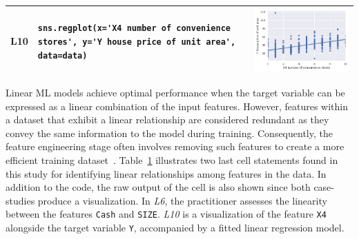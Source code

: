 \documentclass[smallextended]{svjour3}       %
\begin{document}
\begin{table}
\begin{tabular}{@{}m{} m{} m{}@{}}
		L10                                                                                                                   &
		\lstinline[]$sns.regplot(x='X4 number of convenience stores', y='Y house price of unit area', data=data)$             &
		\includegraphics[width=\linewidth]{linear-relation-check-regplot.png}                                                   \\
		\bottomrule
	\end{tabular}
	\label{tab:linear-relation-check}
\end{table}

Linear ML models achieve optimal performance when the target variable can be expressed as a linear combination of the input features. However, features within a dataset that exhibit a linear relationship are considered redundant as they convey the same information to the model during training. Consequently, the feature engineering stage often involves removing such features to create a more efficient training dataset~\citep{shome2022data}. Table~\ref{tab:linear-relation-check} illustrates two last cell statements found in this study for identifying linear relationships among features in the data. In addition to the code, the raw output of the cell is also shown since both case-studies produce a visualization.  In \emph{L6}, the practitioner assesses the linearity between the features \texttt{Cash} and \texttt{SIZE}. \emph{L10} is a visualization of the feature \texttt{X4} alongside the target variable \texttt{Y}, accompanied by a fitted linear regression model.
\end{document}
